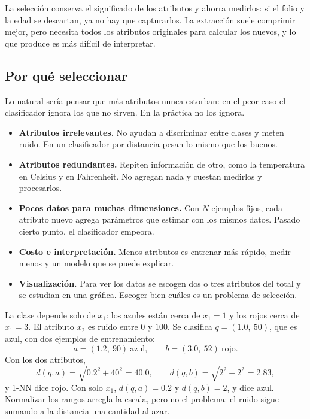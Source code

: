 \documentclass[11pt,letterpaper]{article}
\begin{document}
\begin{idea}
    La selección conserva el significado de los atributos y ahorra
    medirlos: si el folio y la edad se descartan, ya no hay que
    capturarlos. La extracción suele comprimir mejor, pero necesita
    todos los atributos originales para calcular los nuevos, y lo que
    produce es más difícil de interpretar.
\end{idea}


\subsection*{Por qué seleccionar}

Lo natural sería pensar que más atributos nunca estorban: en el peor
caso el clasificador ignora los que no sirven. En la práctica no los
ignora.

\begin{itemize}[itemsep=0.3em]
    \item \textbf{Atributos irrelevantes.} No ayudan a discriminar entre
          clases y meten ruido. En un clasificador por distancia pesan
          lo mismo que los buenos.
    \item \textbf{Atributos redundantes.} Repiten información de otro,
          como la temperatura en Celsius y en Fahrenheit. No agregan
          nada y cuestan medirlos y procesarlos.
    \item \textbf{Pocos datos para muchas dimensiones.} Con $N$
          ejemplos fijos, cada atributo nuevo agrega parámetros que
          estimar con los mismos datos. Pasado cierto punto, el
          clasificador empeora.
    \item \textbf{Costo e interpretación.} Menos atributos es entrenar
          más rápido, medir menos y un modelo que se puede explicar.
    \item \textbf{Visualización.} Para ver los datos se escogen dos o
          tres atributos del total y se estudian en una gráfica. Escoger
          bien cuáles es un problema de selección.
\end{itemize}

\begin{ejemplo}
    La clase depende solo de $x_1$: los azules están cerca de $x_1 = 1$
    y los rojos cerca de $x_1 = 3$. El atributo $x_2$ es ruido entre
    $0$ y $100$. Se clasifica $q = (1.0,\ 50)$, que es azul, con dos
    ejemplos de entrenamiento:
    \[
        a = (1.2,\ 90)\ \text{azul}, \qquad b = (3.0,\ 52)\ \text{rojo}.
    \]
    Con los dos atributos,
    \[
        d(q, a) = \sqrt{0.2^2 + 40^2} = 40.0 , \qquad
        d(q, b) = \sqrt{2^2 + 2^2} = 2.83 ,
    \]
    y 1-NN dice rojo. Con solo $x_1$, $d(q, a) = 0.2$ y $d(q, b) = 2$,
    y dice azul. Normalizar los rangos arregla la escala, pero no el
    problema: el ruido sigue sumando a la distancia una cantidad al
    azar.
\end{ejemplo}
\end{document}
